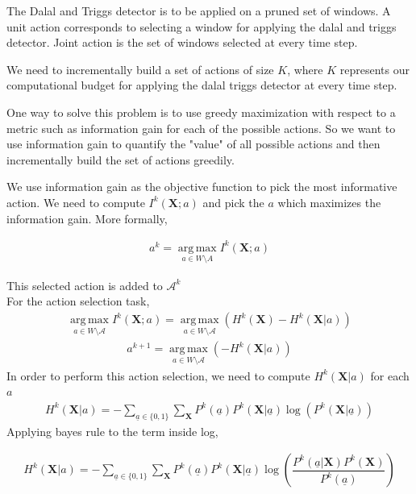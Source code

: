 \documentclass[10pt,twocolumn,letterpaper]{article}
\begin{document}
The Dalal and Triggs detector is to be applied on a pruned set of windows. A unit action corresponds to selecting a window for applying the dalal and triggs detector. Joint action is the set of windows selected at every time step. 

We need to incrementally build a set of actions of size $ K $, where $ K $ represents our computational budget for applying the dalal triggs detector at every time step. 

One way to solve this problem is to use greedy maximization with respect to a metric such as information gain for each of the possible actions. So we want to use information gain to quantify the "value" of all possible actions and then incrementally build the set of actions greedily.
  
We use information gain as the objective function to pick the most informative action.
We need to compute $I^{k}(\textbf{X};a)$ and pick the $a$ which maximizes the information gain. More formally,

\begin{align}
a^{k} = \operatorname*{arg\,max}_{a\in W \setminus A} I^{k}(\textbf{X};a)
\end{align}

This selected action is added to $\mathcal{A}^{k}$\\
For the action selection task,
\begin{align}
\operatorname*{arg\,max}_{a\in W \setminus{\mathcal{A}}}I^{k}(\textbf{X}; a) =\operatorname*{arg\,max}_{a\in W \setminus{\mathcal{A}}} (H^{k}(\textbf{X}) - H^{k}(\textbf{X}|a))
\end{align}
\begin{align}
a^{k+1} =\operatorname*{arg\,max}_{a\in W \setminus{\mathcal{A}}} (- H^{k}(\textbf{X}|a))
\end{align}
In order to perform this action selection, we need to compute $H^{k}(\textbf{X}|a)$ for each $a$
\begin{align}
H^{k}(\textbf{X}| a) = -\sum_{\underline{a}\in\lbrace 0 ,1 \rbrace} \sum_{\textbf{X}} P^{k}(\underline{a})P^{k}(\textbf{X}| \underline{a}) \log(P^{k}(\textbf{X}| \underline{a}))
\end{align}
Applying bayes rule to the term inside log,

\begin{align}
H^{k}(\textbf{X}| a)= -\sum_{\underline{a}\in\lbrace 0 ,1 \rbrace} \sum_{\textbf{X}} P^{k}( \underline{a})P^{k}(\textbf{X}| \underline{a}) \log(\dfrac{P^{k}( \underline{a}|\textbf{X})P^{k}(\textbf{X})}{P^{k}( \underline{a})})
\end{align}
\end{document}
